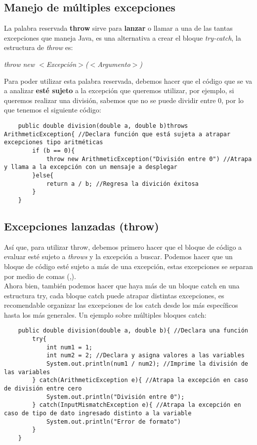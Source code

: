 \subsection{Manejo de múltiples excepciones}
La palabra reservada \textbf{throw} sirve para \textbf{lanzar} o llamar a una de las tantas excepciones que maneja Java, es una alternativa a crear el bloque \textit{try-catch}, la estructura de \textit{throw} es:\begin{center}\textit{throw new $<$Excepción$>$($<$Argumento$>$)}\end{center}
Para poder utilizar esta palabra reservada, debemos hacer que el código que se va a analizar \textbf{esté sujeto} a la excepción que queremos utilizar, por ejemplo, si queremos realizar una división, sabemos que no se puede dividir entre 0, por lo que tenemos el siguiente código:
\begin{lstlisting}
    public double division(double a, double b)throws ArithmeticException{ //Declara función que está sujeta a atrapar excepciones tipo aritméticas
        if (b == 0){
            throw new ArithmeticException("División entre 0") //Atrapa y llama a la excepción con un mensaje a desplegar
        }else{
            return a / b; //Regresa la divición éxitosa
        }
    }
\end{lstlisting}

\subsection{Excepciones lanzadas (throw)}
Así que, para utilizar throw, debemos primero hacer que el bloque de código a evaluar esté sujeto a \textit{throws} y la excepción a buscar. Podemos hacer que un bloque de código esté sujeto a más de una excepción, estas excepciones se separan por medio de comas (,).\\
Ahora bien, también podemos hacer que haya más de un bloque catch en una estructura try, cada bloque catch puede atrapar distintas excepciones, es recomendable organizar las excepciones de los catch desde los más específicos hasta los más generales. Un ejemplo sobre múltiples bloques catch:
\begin{lstlisting}
    public double division(double a, double b){ //Declara una función
        try{
            int num1 = 1;
            int num2 = 2; //Declara y asigna valores a las variables
            System.out.println(num1 / num2); //Imprime la división de las variables
        } catch(ArithmeticException e){ //Atrapa la excepción en caso de división entre cero
            System.out.println("División entre 0");
        } catch(InputMismatchException e){ //Atrapa la excepción en caso de tipo de dato ingresado distinto a la variable
            System.out.println("Error de formato")
        }
    }
\end{lstlisting}

